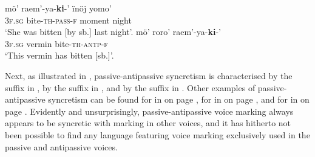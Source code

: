 \ea {} \citep[306ff.]{sakel:2004}
\ea\label{ex:Moseten:bite:a}
	\gll	mö’ raem’-ya-\textbf{ki}-’ ïnöj yomo’ \\
			\textsc{3f.sg} bite-\textsc{th-pass-f} moment night \\
	\glt	‘She was bitten [by sb.] last night’.
\ex\label{ex:Moseten:bite:b}
	\gll	mö’ roro’ raem’-ya-\textbf{ki}-’ \\
			\textsc{3f.sg} vermin bite-\textsc{th-antp-f} \\
	\glt	‘This vermin has bitten [sb.]’.
	\z 
\z

Next, as illustrated in , passive-antipassive syncretism is characterised by the suffix  in , by the suffix  in , and by the suffix  in . Other examples of passive-antipassive syncretism can be found for  in  on page \pageref{tab:ch3:type1a-examples-2}, for  in  on page \pageref{tab:ch5:pass-antp-refl-antc}, and for  in  on page \pageref{tab:ch5:multiplex}. Evidently and unsurprisingly, passive-antipassive voice marking always appears to be syncretic with marking in other voices, and it has hitherto not been possible to find any language featuring voice marking exclusively used in the passive and antipassive voices.


